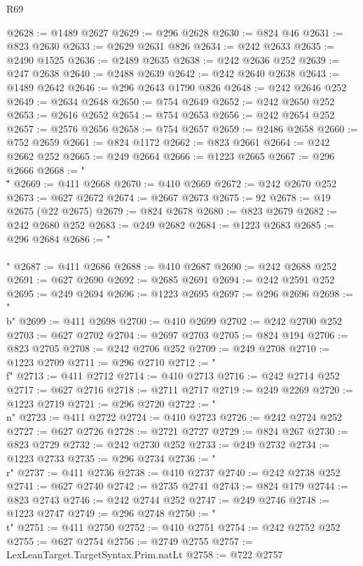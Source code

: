 \begin{lexlean}{R69}
\begin{coremodule}
{@2628 := @1489 @2627
@2629 := @296 @2628
@2630 := @824 @46
@2631 := @823 @2630
@2633 := @2629 @2631 @826
@2634 := @242 @2633
@2635 := @2490 @1525
@2636 := @2489 @2635
@2638 := @242 @2636 @252
@2639 := @247 @2638
@2640 := @2488 @2639
@2642 := @242 @2640 @2638
@2643 := @1489 @2642
@2646 := @296 @2643 @1790 @826
@2648 := @242 @2646 @252
@2649 := @2634 @2648
@2650 := @754 @2649
@2652 := @242 @2650 @252
@2653 := @2616 @2652
@2654 := @754 @2653
@2656 := @242 @2654 @252
@2657 := @2576 @2656
@2658 := @754 @2657
@2659 := @2486 @2658
@2660 := @752 @2659
@2661 := @824 @1172
@2662 := @823 @2661
@2664 := @242 @2662 @252
@2665 := @249 @2664
@2666 := @1223 @2665
@2667 := @296 @2666
@2668 := "\\\""
@2669 := @411 @2668
@2670 := @410 @2669
@2672 := @242 @2670 @252
@2673 := @627 @2672
@2674 := @2667 @2673
@2675 := 92
@2678 := @19 @2675 (@22 @2675)
@2679 := @824 @2678
@2680 := @823 @2679
@2682 := @242 @2680 @252
@2683 := @249 @2682
@2684 := @1223 @2683
@2685 := @296 @2684
@2686 := "\\\\"
@2687 := @411 @2686
@2688 := @410 @2687
@2690 := @242 @2688 @252
@2691 := @627 @2690
@2692 := @2685 @2691
@2694 := @242 @2591 @252
@2695 := @249 @2694
@2696 := @1223 @2695
@2697 := @296 @2696
@2698 := "\\b"
@2699 := @411 @2698
@2700 := @410 @2699
@2702 := @242 @2700 @252
@2703 := @627 @2702
@2704 := @2697 @2703
@2705 := @824 @194
@2706 := @823 @2705
@2708 := @242 @2706 @252
@2709 := @249 @2708
@2710 := @1223 @2709
@2711 := @296 @2710
@2712 := "\\f"
@2713 := @411 @2712
@2714 := @410 @2713
@2716 := @242 @2714 @252
@2717 := @627 @2716
@2718 := @2711 @2717
@2719 := @249 @2269
@2720 := @1223 @2719
@2721 := @296 @2720
@2722 := "\\n"
@2723 := @411 @2722
@2724 := @410 @2723
@2726 := @242 @2724 @252
@2727 := @627 @2726
@2728 := @2721 @2727
@2729 := @824 @267
@2730 := @823 @2729
@2732 := @242 @2730 @252
@2733 := @249 @2732
@2734 := @1223 @2733
@2735 := @296 @2734
@2736 := "\\r"
@2737 := @411 @2736
@2738 := @410 @2737
@2740 := @242 @2738 @252
@2741 := @627 @2740
@2742 := @2735 @2741
@2743 := @824 @179
@2744 := @823 @2743
@2746 := @242 @2744 @252
@2747 := @249 @2746
@2748 := @1223 @2747
@2749 := @296 @2748
@2750 := "\\t"
@2751 := @411 @2750
@2752 := @410 @2751
@2754 := @242 @2752 @252
@2755 := @627 @2754
@2756 := @2749 @2755
@2757 := LexLeanTarget.TargetSyntax.Prim.natLt
@2758 := @722 @2757
}
\end{coremodule}
\end{lexlean}
